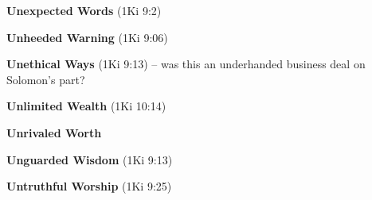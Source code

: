 \begin{compactenum}[I.]
     \item \textbf{Unexpected Words}    (1Ki 9:2) 
    \item \textbf{Unheeded Warning}    (1Ki 9:06) 
    \item \textbf{Unethical Ways}    (1Ki 9:13) -- was this an underhanded business deal on Solomon's part?
    \item \textbf{Unlimited Wealth}    (1Ki 10:14) 
	\item \textbf{Unrivaled Worth}  %
	\item \textbf{Unguarded Wisdom}    (1Ki 9:13)
	\item \textbf{Untruthful Worship}    (1Ki 9:25) 
\end{compactenum}


